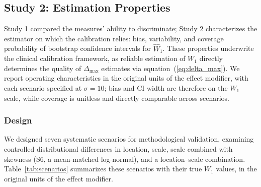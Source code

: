 \subsection{Study 2: Estimation Properties}\label{sec:study1}

Study 1 compared the measures' ability to discriminate; Study 2 characterizes the estimator on which the calibration relies: bias, variability, and coverage probability of bootstrap confidence intervals for $\widehat{W}_1$. These properties underwrite the clinical calibration framework, as reliable estimation of $W_1$ directly determines the quality of $\Delta_{\max}$ estimates via equation~(\ref{eq:delta_max}). We report operating characteristics in the original units of the effect modifier, with each scenario specified at $\sigma = 10$; bias and CI width are therefore on the $W_1$ scale, while coverage is unitless and directly comparable across scenarios.

\subsubsection{Design}\label{sec:sim_design}

We designed seven systematic scenarios for methodological validation, examining controlled distributional differences in location, scale, scale combined with skewness (S6, a mean-matched log-normal), and a location--scale combination. Table~\ref{tab:scenarios} summarizes these scenarios with their true $W_1$ values, in the original units of the effect modifier.

